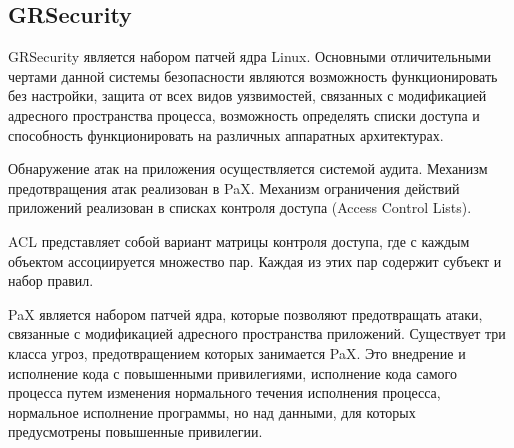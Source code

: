 \subsection{GRSecurity} 
 
GRSecurity является набором патчей ядра Linux.
Основными отличительными чертами данной системы 
безопасности являются возможность функционировать 
без настройки, защита от всех видов уязвимостей, 
связанных с модификацией адресного пространства 
процесса, возможность определять списки доступа и 
способность функционировать на различных аппаратных 
архитектурах. 

Обнаружение атак на приложения осуществляется
системой аудита. Механизм предотвращения атак 
реализован в PaX. Механизм ограничения действий 
приложений реализован в списках контроля доступа
(Access Control Lists). 

ACL представляет собой  вариант матрицы контроля доступа, где с 
каждым объектом ассоциируется множество пар. 
Каждая из этих пар содержит субъект и набор правил. 

PaX является набором патчей ядра, которые позволяют 
предотвращать атаки, связанные с модификацией адресного
пространства приложений. 
Существует три класса угроз, предотвращением которых 
занимается PaX. Это внедрение и исполнение кода с 
повышенными привилегиями, исполнение кода самого 
процесса путем изменения нормального течения 
исполнения процесса, нормальное исполнение программы, 
но над данными, для которых предусмотрены повышенные 
привилегии. 

\begin{comment}
Non-executable pages (NOEXEC) и mmap/mprotect 
(MPROTECT) предотвращают внедрение и исполнение 
кода с повышенными привилегиями. 
Address Layout Randomisation (ASLR) 
позволяет предотвратить все три упомянутые вида атак в той 
ситуации, когда атакующий заранее закладывается на 
адреса в атакуемом процессе и не может узнать о них 
в процессе исполнения. Так как PaX полностью внедрен 
в ядро, предполагается то, что ядро является Trusted 
Computer Base. Инструментарий позволяет предотвратить 
исполнение стека, обеспечить рандомизацию 
размещения адресов внутри адресного пространства 
(address space layout randomization) . 
Основная цель данного проекта — изучение различных защитных 
механизмов, защищающих от эксплойтов уязвимостей ПО, которые 
предоставляют злоумышленнику полные права на чтение/запись в 
системе. Исполнение кода связано с необходимостью изменять 
ход выполнения процесса используя уже существующий код. Одна 
из основных проблем — подмена адресов возврата из функций и 
подмена самих адресов функций. Для установки PaX требуется 
наложить патч на дерево исходных кодов ядра, после чего собрать 
ядро и установить в систему. 
\end{comment}

